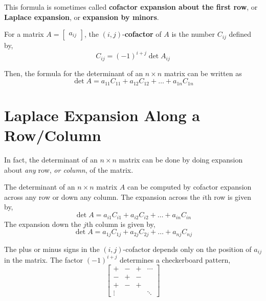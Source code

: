 \documentclass[letterpaper,12pt]{article}
\begin{document}
This formula is sometimes called \textbf{cofactor expansion about the first row}, or \textbf{Laplace expansion}, or \textbf{expansion by minors}.

\begin{definition}
For a matrix $A = \begin{bmatrix} a_{ij} \end{bmatrix}$, the $(i,j)$-\textbf{cofactor} of $A$ is the number $C_{ij}$ defined by,
\begin{equation*}
    C_{ij} = (-1)^{i+j} \det{A_{ij}}
\end{equation*}

Then, the formula for the determinant of an $n \times n$ matrix can be written as
\begin{equation*}
    \det{A} = a_{11} C_{11} + a_{12} C_{12} + \dots + a_{1n} C_{1n}
\end{equation*}
\end{definition}

\section*{Laplace Expansion Along a Row/Column}
In fact, the determinant of an $n \times n$ matrix can be done by doing expansion about \textit{any} row, \textit{or column}, of the matrix.

\begin{theorem}
The determinant of an $n \times n$ matrix $A$ can be computed by cofactor expansion across any row or down any column. The expansion across the $i$th row is given by,
\begin{equation*}
    \det{A} = a_{i1} C_{i1} + a_{i2} C_{i2} + \dots + a_{in} C_{in}
\end{equation*}
The expansion down the $j$th column is given by,
\begin{equation*}
    \det{A} = a_{1j} C_{1j} + a_{2j} C_{2j} + \dots + a_{nj} C_{nj}
\end{equation*}
\end{theorem}

The plus or minus signs in the $(i,j)$-cofactor depends only on the position of $a_{ij}$ in the matrix. The factor $(-1)^{i+j}$ determines a checkerboard pattern,
\begin{equation*}
    \begin{bmatrix} + & - & + & \cdots \\ - & + & - & \\ + & - & + & \\ \vdots & & & \ddots \end{bmatrix}
\end{equation*}
\end{document}
